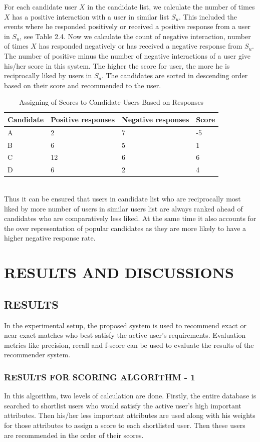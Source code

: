 \documentclass[12pt,oneside]{book}
\begin{document}
For each candidate user $X$  in the candidate list, we calculate the number of times $X$
has a positive interaction with a user in similar list $S_u$. This included the events where he responded positively or received a positive response from a user in $S_u$, see Table 2.4. Now we calculate the count of negative interaction, number of times $X$ has responded negatively or has received a negative response from $S_u$. The number of positive minus the number of negative interactions of a user give his/her score in this system. The higher the score for user, the more he is reciprocally liked by users in $S_u$. The candidates are sorted in descending order based on their score and recommended to the user.
\begin{table}[h!]
\centering
\caption{Assigning of Scores to Candidate Users Based on Responses}
\vspace{0.1in}
 \begin{tabular}{|m{3cm}|m{4cm}|m{4cm}|m{2em}|}
 \hline
 Candidate & Positive responses & Negative responses & Score\\
\hline
A & 2 & 7 & -5\\
\hline
B & 6 & 5 & 1\\
\hline
C & 12 & 6 & 6\\
\hline
D & 6 & 2 & 4\\
\hline
\end{tabular}
\end{table}\\
Thus it can be ensured that users in candidate list who are reciprocally most liked by more  number of users in similar users list are always ranked ahead of candidates who are comparatively less liked. At the same time it also accounts for the over representation of popular candidates as they are more likely to have a higher negative response rate.
\newpage
\chapter{RESULTS AND DISCUSSIONS}
\section{RESULTS}
In the experimental setup, the proposed system is used to recommend exact or near exact matches who best satisfy the active user's requirements. Evaluation metrics like precision, recall and f-score can be used to evaluate the results of the recommender system.
\subsection{RESULTS FOR SCORING ALGORITHM - 1}
In this algorithm, two levels of calculation are done. Firstly, the entire database is searched to shortlist users who would satisfy the active user's high important attributes. Then his/her less important attributes are used along with his weights for those attributes to assign a score to each shortlisted user. Then these users are recommended in the order of their scores.
\end{document}
